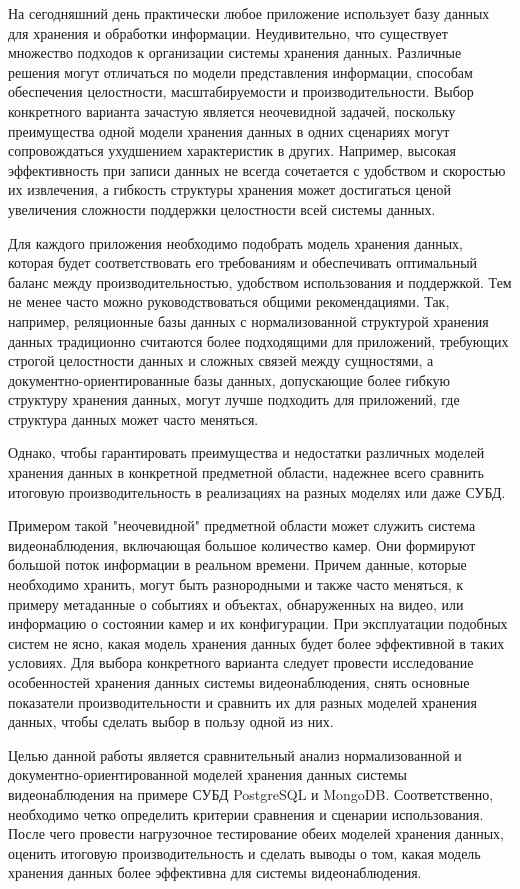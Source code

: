 На сегодняшний день практически любое приложение использует базу данных для хранения и обработки
информации. Неудивительно, что существует множество подходов к организации системы хранения данных.
Различные решения могут отличаться по модели представления информации, способам обеспечения
целостности, масштабируемости и производительности. Выбор конкретного варианта зачастую является
неочевидной задачей, поскольку преимущества одной модели хранения данных в одних сценариях могут
сопровождаться ухудшением характеристик в других. Например, высокая эффективность при записи данных
не всегда сочетается с удобством и скоростью их извлечения, а гибкость структуры хранения может
достигаться ценой увеличения сложности поддержки целостности всей системы данных.

Для каждого приложения необходимо подобрать модель хранения данных, которая будет соответствовать
его требованиям и обеспечивать оптимальный баланс между производительностью, удобством
использования и поддержкой. Тем не менее часто можно руководствоваться общими рекомендациями.
Так, например, реляционные базы данных с нормализованной структурой хранения данных традиционно
считаются более подходящими для приложений, требующих строгой целостности данных и сложных связей
между сущностями, а документно-ориентированные базы данных, допускающие более гибкую структуру
хранения данных, могут лучше подходить для приложений, где структура данных может часто меняться.

Однако, чтобы гарантировать преимущества и недостатки различных моделей хранения данных в
конкретной предметной области, надежнее всего сравнить итоговую производительность в реализациях
на разных моделях или даже СУБД.

Примером такой "неочевидной" предметной области может служить система видеонаблюдения,
включающая большое количество камер. Они формируют большой поток информации в реальном времени.
Причем данные, которые необходимо хранить, могут быть разнородными и также часто меняться,
к примеру метаданные о событиях и объектах, обнаруженных на видео, или информацию о состоянии
камер и их конфигурации. При эксплуатации подобных систем не ясно, какая модель хранения данных
будет более эффективной в таких условиях. Для выбора конкретного варианта следует провести
исследование особенностей хранения данных системы видеонаблюдения, снять основные показатели
производительности и сравнить их для разных моделей хранения данных, чтобы сделать выбор в пользу
одной из них.

Целью данной работы является сравнительный анализ нормализованной и документно-ориентированной
моделей хранения данных системы видеонаблюдения на примере СУБД PostgreSQL и MongoDB.
Соответственно, необходимо четко определить критерии сравнения и сценарии использования. После
чего провести нагрузочное тестирование обеих моделей хранения данных, оценить итоговую
производительность и сделать выводы о том, какая модель хранения данных более эффективна для
системы видеонаблюдения.

